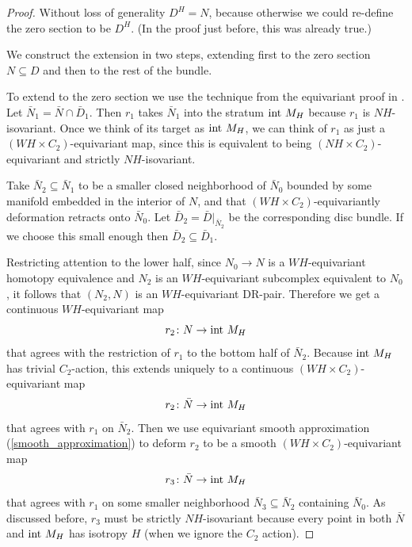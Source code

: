 \documentclass[11pt]{amsart}
\theoremstyle{definition}
\numberwithin{equation}{section}
\numberwithin{figure}{section}
\begin{document}
\begin{proof}
	Without loss of generality $D^H = N$, because otherwise we could re-define the zero section to be $D^H$. (In the proof just before, this was already true.)
	
	We construct the extension in two steps, extending first to the zero section $N \subseteq D$ and then to the rest of the bundle. %

	To extend to the zero section we use the technique from the equivariant proof in \cite[Lem 4.3]{GIMM1}. Let $\bar N_1 = \bar N \cap \bar D_1$. Then $r_1$ takes $\bar N_1$ into the stratum $\textup{int }M_H$ because $r_1$ is $NH$-isovariant. Once we think of its target as $\textup{int }M_H$, we can think of $r_1$ as just a $(WH \times C_2)$-equivariant map, since this is equivalent to being $(NH \times C_2)$-equivariant and strictly $NH$-isovariant.
	
	Take $\bar N_2 \subseteq \bar N_1$ to be a smaller closed neighborhood of $\bar N_0$ bounded by some manifold embedded in the interior of $N$, and that $(WH \times C_2)$-equivariantly deformation retracts onto $\bar N_0$. Let $\bar D_2 = \bar D|_{\bar N_2}$ be the corresponding disc bundle. If we choose this small enough then $\bar D_2 \subseteq \bar D_1$.
	
	Restricting attention to the lower half, since $N_0 \to N$ is a $WH$-equivariant homotopy equivalence and $N_2$ is an $WH$-equivariant subcomplex equivalent to $N_0$, it follows that $(N_2,N)$ is an $WH$-equivariant DR-pair. Therefore we get a continuous $WH$-equivariant map
	\[ r_2\colon N \to \textup{int }M_H \]
	that agrees with the restriction of $r_1$ to the bottom half of $\bar N_2$. Because $\textup{int }M_H$ has trivial $C_2$-action, this extends uniquely to a continuous $(WH \times C_2)$-equivariant map
	\[ r_2\colon \bar N \to \textup{int }M_H \]
	that agrees with $r_1$ on $\bar N_2$. Then we use equivariant smooth approximation (\autoref{smooth_approximation}) to deform $r_2$ to be a smooth $(WH \times C_2)$-equivariant map
	\[ r_3\colon \bar N \to \textup{int }M_H \]
	that agrees with $r_1$ on some smaller neighborhood $\bar N_3 \subseteq \bar N_2$ containing $\bar N_0$. As discussed before, $r_3$ must be strictly $NH$-isovariant because every point in both $\bar N$ and $\textup{int }M_H$ has isotropy $H$ (when we ignore the $C_2$ action).
	

\end{proof}
\end{document}
